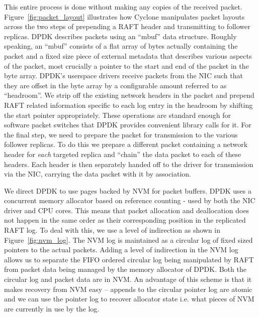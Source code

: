 \documentclass[letterpaper,twocolumn,10pt]{article}
\begin{document}
This entire process is done without making any copies of the received packet.
Figure~\ref{fig:packet_layout} illustrates how
Cyclone manipulates packet layouts across the two steps of prepending a RAFT
header and transmitting to follower replicas. DPDK describes packets using an
``mbuf'' data structure. Roughly speaking, an ``mbuf'' consists of a flat array
of bytes actually containing the packet and a fixed size piece of external
metadata that describes various aspects of the packet, most crucially a pointer
to the start and end of the packet in the byte array. DPDK's userspace drivers
receive packets from the NIC such that they are offset in the byte array by a
configurable amount referred to as ``headroom''. We strip off the existing
network headers in the packet and prepend RAFT related information specific to
each log entry in the headroom by shifting the start pointer appropriately.
These operations are standard enough for software packet switches that DPDK
provides convenient library calls for it. For the final step, we need to prepare
the packet for transmission to the various follower replicas. To do this we
prepare a different packet containing a network header for \emph{each}
targeted replica and ``chain'' the data packet to each of these headers. Each
header is then separately handed off to the driver for transmission via the NIC,
carrying the data packet with it by association.

We direct DPDK to use pages backed by NVM for packet buffers. DPDK uses a
concurrent memory allocator based on reference counting - used by both the NIC
driver and CPU cores. This means that packet allocation and deallocation does
not happen in the same order as their corresponding position in the replicated
RAFT log. To deal with this, we use a level of indirection as shown in
Figure~\ref{fig:nvm_log}. The NVM log is maintained as a circular log of fixed
sized pointers to the actual packets. Adding a level of indirection in the NVM
log allows us to separate the FIFO ordered circular log being manipulated by
RAFT from packet data being managed by the memory allocator of DPDK. Both the
circular log and packet data are in NVM. An advantage of this scheme is that it
makes recovery from NVM easy -- appends to the circular pointer log are atomic
and we can use the pointer log to recover allocator state i.e. what pieces of
NVM are currently in use by the log.
\end{document}
